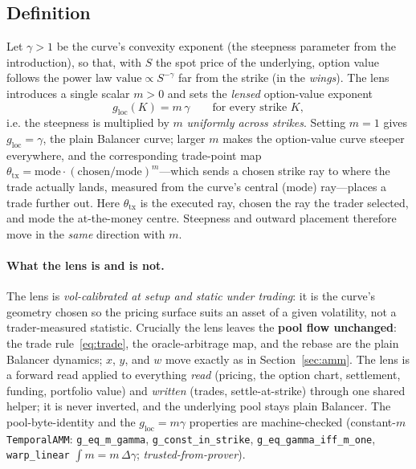 \documentclass[11pt]{article}
\newcommand{\tfp}{\emph{trusted-from-prover}}
\begin{document}
\subsection{Definition}
Let $\gamma>1$ be the curve's convexity exponent (the steepness parameter from the
introduction), so that, with $S$ the spot price of the underlying, option value
follows the power law $\mathrm{value}\propto S^{-\gamma}$ far from the strike (in
the \emph{wings}). The lens introduces a single scalar $m>0$ and sets the
\emph{lensed} option-value exponent
\begin{equation}
  g_{\mathrm{loc}}(K)=m\,\gamma\qquad\text{for every strike }K,
  \label{eq:lens}
\end{equation}
i.e. the steepness is multiplied by $m$ \emph{uniformly across strikes}. Setting
$m=1$ gives $g_{\mathrm{loc}}=\gamma$, the plain Balancer curve; larger $m$ makes
the option-value curve steeper everywhere, and the corresponding trade-point map
$\theta_{\mathrm{tx}}=\mathrm{mode}\cdot(\mathrm{chosen}/\mathrm{mode})^{m}$---which
sends a chosen strike ray to where the trade actually lands, measured from the
curve's central ($\mathrm{mode}$) ray---places a trade further out. Here
$\theta_{\mathrm{tx}}$ is the executed ray, $\mathrm{chosen}$ the ray the trader
selected, and $\mathrm{mode}$ the at-the-money centre. Steepness and outward
placement therefore move in the \emph{same} direction with $m$.

\paragraph{What the lens is and is not.}
The lens is \emph{vol-calibrated at setup and static under trading}: it is the
curve's geometry chosen so the pricing surface suits an asset of a given
volatility, not a trader-measured statistic. Crucially the lens leaves the
\textbf{pool flow unchanged}: the trade rule~\eqref{eq:trade}, the
oracle-arbitrage map, and the rebase are the plain Balancer dynamics; $x$, $y$,
and $w$ move exactly as in Section~\ref{sec:amm}. The lens is a forward read
applied to everything \emph{read} (pricing, the option chart, settlement,
funding, portfolio value) and \emph{written} (trades, settle-at-strike) through
one shared helper; it is never inverted, and the underlying pool stays plain
Balancer. The pool-byte-identity and the $g_{\mathrm{loc}}=m\gamma$ properties
are machine-checked (constant-$m$ \texttt{TemporalAMM}: \texttt{g\_eq\_m\_gamma},
\texttt{g\_const\_in\_strike}, \texttt{g\_eq\_gamma\_iff\_m\_one},
\texttt{warp\_linear} $\int m = m\,\Delta\gamma$; \tfp{}).
\end{document}
